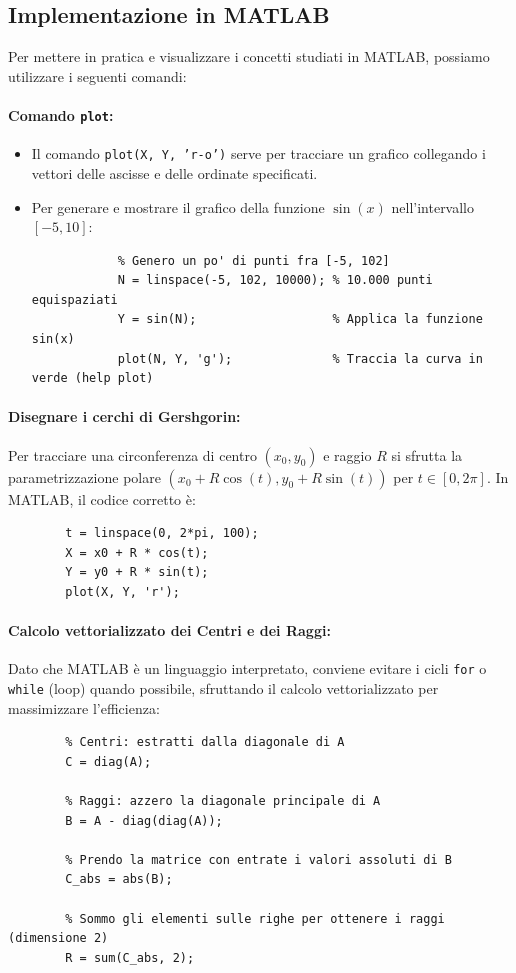 \documentclass[a4paper,12pt]{article}
\begin{document}
	\subsection{Implementazione in MATLAB}
	Per mettere in pratica e visualizzare i concetti studiati in MATLAB, possiamo utilizzare i seguenti comandi:
	
	\paragraph{Comando \texttt{plot}:}
	\begin{itemize}
		\item Il comando \texttt{plot(X, Y, 'r-o')} serve per tracciare un grafico collegando i vettori delle ascisse e delle ordinate specificati.
		\item Per generare e mostrare il grafico della funzione $\sin(x)$ nell'intervallo $[-5, 10]$:
		\begin{verbatim}
			% Genero un po' di punti fra [-5, 102]
			N = linspace(-5, 102, 10000); % 10.000 punti equispaziati
			Y = sin(N);                   % Applica la funzione sin(x)
			plot(N, Y, 'g');              % Traccia la curva in verde (help plot)
		\end{verbatim}
	\end{itemize}
	
	\paragraph{Disegnare i cerchi di Gershgorin:}
	Per tracciare una circonferenza di centro $(x_0, y_0)$ e raggio $R$ si sfrutta la parametrizzazione polare $(x_0 + R\cos(t), y_0 + R\sin(t))$ per $t \in [0, 2\pi]$.
	In MATLAB, il codice corretto è:
	\begin{verbatim}
		t = linspace(0, 2*pi, 100);
		X = x0 + R * cos(t);
		Y = y0 + R * sin(t);
		plot(X, Y, 'r');
	\end{verbatim}
	
	\paragraph{Calcolo vettorializzato dei Centri e dei Raggi:}
	Dato che MATLAB è un linguaggio interpretato, conviene evitare i cicli \texttt{for} o \texttt{while} (loop) quando possibile, sfruttando il calcolo vettorializzato per massimizzare l'efficienza:
	\begin{verbatim}
		% Centri: estratti dalla diagonale di A
		C = diag(A); 
		
		% Raggi: azzero la diagonale principale di A
		B = A - diag(diag(A)); 
		
		% Prendo la matrice con entrate i valori assoluti di B
		C_abs = abs(B); 
		
		% Sommo gli elementi sulle righe per ottenere i raggi (dimensione 2)
		R = sum(C_abs, 2); 
	\end{verbatim}
	
\end{document}
